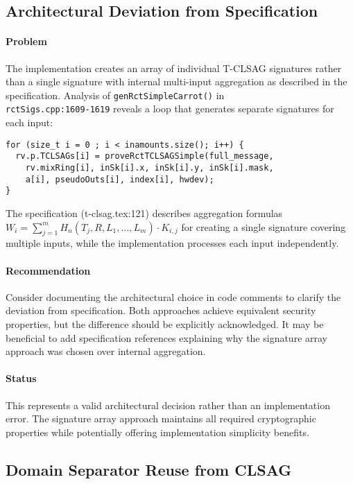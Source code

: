 \documentclass{article}
\begin{document}
\subsection{Architectural Deviation from Specification}
\paragraph{Problem}
The implementation creates an array of individual T-CLSAG signatures rather 
than a single signature with internal multi-input aggregation as described 
in the specification.  Analysis of \texttt{genRctSimpleCarrot()} in \\
\texttt{rctSigs.cpp:1609-1619} reveals a loop that generates separate 
signatures for each input:
\begin{verbatim}
for (size_t i = 0 ; i < inamounts.size(); i++) {
  rv.p.TCLSAGs[i] = proveRctTCLSAGSimple(full_message, 
    rv.mixRing[i], inSk[i].x, inSk[i].y, inSk[i].mask, 
    a[i], pseudoOuts[i], index[i], hwdev);
}
\end{verbatim}
The specification (t-clsag.tex:121) describes aggregation formulas \\
$W_i = \sum_{j=1}^{m} H_n(T_j, R, L_1, \ldots, L_m) \cdot K_{i,j}$ for 
creating a single signature covering multiple inputs, while the implementation 
processes each input independently.

\paragraph{Recommendation}
Consider documenting the architectural choice in code comments to clarify 
the deviation from specification.  Both approaches achieve equivalent security 
properties, but the difference should be explicitly acknowledged.  It may be 
beneficial to add specification references explaining why the signature array 
approach was chosen over internal aggregation.

\paragraph{Status}
This represents a valid architectural decision rather than an implementation 
error.  The signature array approach maintains all required cryptographic 
properties while potentially offering implementation simplicity benefits.

\subsection{Domain Separator Reuse from CLSAG}
\end{document}
